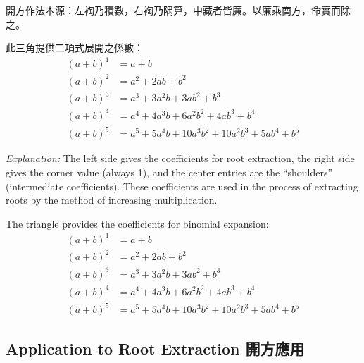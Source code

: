 \documentclass[11pt,a4paper]{article}
\newcommand{\zh}[1]{{\CJKfamily{\CJKrmdefault} #1}}
\newenvironment{chside}{%
  \begin{minipage}[t]{0.48\textwidth}%
  \setlength{\parindent}{1.5em}%
  \linespread{1.25}\selectfont%
  \small%
}{%
  \end{minipage}%
}
\newenvironment{enside}{%
  \hfill\begin{minipage}[t]{0.48\textwidth}%
  \setlength{\parindent}{1em}%
  \linespread{1.15}\selectfont%
  \small%
}{%
  \end{minipage}%
}
\begin{document}
\noindent\begin{chside}
\zh{開方作法本源：左裪乃積數，右裪乃隅算，中藏者皆廉。以廉乘商方，命實而除之。}

\medskip
此三角提供二項式展開之係數：
\begin{align*}
(a+b)^1 &= a + b \\
(a+b)^2 &= a^2 + 2ab + b^2 \\
(a+b)^3 &= a^3 + 3a^2b + 3ab^2 + b^3 \\
(a+b)^4 &= a^4 + 4a^3b + 6a^2b^2 + 4ab^3 + b^4 \\
(a+b)^5 &= a^5 + 5a^4b + 10a^3b^2 + 10a^2b^3 + 5ab^4 + b^5
\end{align*}
\end{chside}%
\begin{enside}
\textit{Explanation:} The left side gives the coefficients for root
extraction, the right side gives the corner value (always 1), and the center
entries are the ``shoulders'' (intermediate coefficients). These coefficients
are used in the process of extracting roots by the method of increasing
multiplication.

\medskip
The triangle provides the coefficients for binomial expansion:
\begin{align*}
(a+b)^1 &= a + b \\
(a+b)^2 &= a^2 + 2ab + b^2 \\
(a+b)^3 &= a^3 + 3a^2b + 3ab^2 + b^3 \\
(a+b)^4 &= a^4 + 4a^3b + 6a^2b^2 + 4ab^3 + b^4 \\
(a+b)^5 &= a^5 + 5a^4b + 10a^3b^2 + 10a^2b^3 + 5ab^4 + b^5
\end{align*}
\end{enside}

\subsection{Application to Root Extraction \zh{開方應用}}
\end{document}
